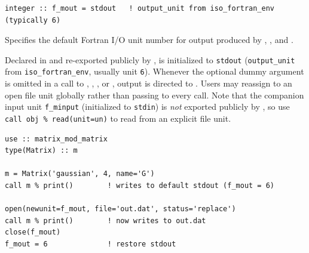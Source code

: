 \lstset{language=[95]Fortran}
\begin{lstlisting}
integer :: f_mout = stdout   ! output_unit from iso_fortran_env (typically 6)
\end{lstlisting}

Specifies the default Fortran I/O unit number for output produced by , , and .

Declared in  and re-exported publicly by ,  is initialized to \texttt{stdout} (\texttt{output\_unit} from \texttt{iso\_fortran\_env}, usually unit \texttt{6}). Whenever the optional  dummy argument is omitted in a call to , , , or , output is directed to . Users may reassign  to an open file unit globally rather than passing  to every call. Note that the companion input unit \texttt{f\_minput} (initialized to \texttt{stdin}) is \emph{not} exported publicly by , so use \texttt{call obj \% read(unit=un)} to read from an explicit file unit.

\begin{description}[leftmargin=2.2cm, style=nextline]
\end{description}

\lstset{language=[95]Fortran}
\begin{lstlisting}
use :: matrix_mod_matrix
type(Matrix) :: m

m = Matrix('gaussian', 4, name='G')
call m % print()        ! writes to default stdout (f_mout = 6)

open(newunit=f_mout, file='out.dat', status='replace')
call m % print()        ! now writes to out.dat
close(f_mout)
f_mout = 6              ! restore stdout
\end{lstlisting}


